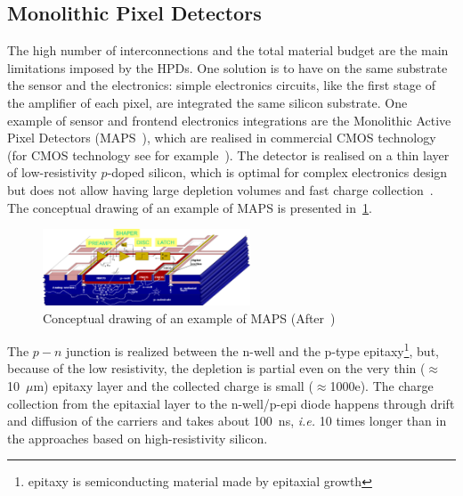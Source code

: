 \subsection{Monolithic Pixel Detectors}
\label{sec:MAPS}
The high number of interconnections and the total material budget are the main limitations imposed 
by the HPDs. One solution is to have on the same substrate the sensor and the electronics: 
 simple electronics circuits, like the first stage of the amplifier of each pixel, are integrated the 
 same silicon substrate. 
 One example of sensor and frontend electronics integrations are the Monolithic Active Pixel Detectors 
 (MAPS~\cite{CLAUS2001120}), which are realised  in  
 commercial CMOS technology (for CMOS technology see for example~\cite{Lutz:411172}).  
 The detector is realised on a thin layer of low-resistivity $p$-doped silicon, which is optimal for complex 
 electronics design but does not allow having large depletion volumes and fast charge 
 collection~\cite{rossi2006pixel}. The conceptual drawing of an example of MAPS is presented 
 in~\ref{fig:maps}.
 \begin{figure}[htbp]
   \centering
  \includegraphics[width=0.55\textwidth]{maps.pdf} 
      \caption{\label{fig:maps} Conceptual drawing of an example of MAPS (After~\cite{ReApsel})}
\end{figure}
The $p-n$ junction is realized between the n-well and the p-type epitaxy\footnote{epitaxy is 
semiconducting material made by epitaxial growth}, but, because of the low resistivity, the depletion is 
partial even on the very thin ($\approx$10~$\mu$m) epitaxy layer and the collected charge is small 
($\approx$1000e). The 
charge collection from the epitaxial layer to the n-well/p-epi diode happens through drift and diffusion of 
the carriers and takes about 100~ns, {\it i.e.} 10 times longer than in the approaches based on 
high-resistivity silicon.


